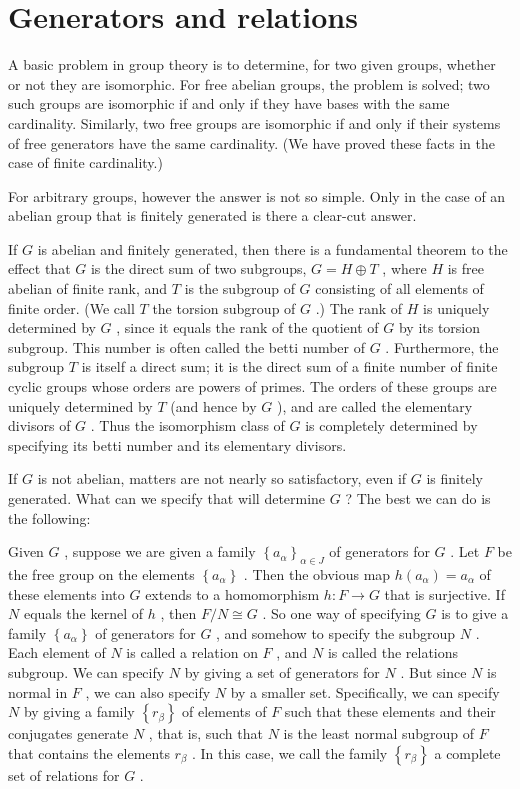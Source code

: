 \documentclass[10pt]{article}
\begin{document}
\section*{Generators and relations}

A basic problem in group theory is to determine, for two given groups, whether or not they are isomorphic. For free abelian groups, the problem is solved; two such groups are isomorphic if and only if they have bases with the same cardinality. Similarly, two free groups are isomorphic if and only if their systems of free generators have the same cardinality. (We have proved these facts in the case of finite cardinality.)

For arbitrary groups, however the answer is not so simple. Only in the case of an abelian group that is finitely generated is there a clear-cut answer.

If \(G\) is abelian and finitely generated, then there is a fundamental theorem to the effect that \(G\) is the direct sum of two subgroups, \(G = H \oplus  T\) , where \(H\) is free abelian of finite rank, and \(T\) is the subgroup of \(G\) consisting of all elements of finite order. (We call \(T\) the torsion subgroup of \(G\) .) The rank of \(H\) is uniquely determined by \(G\) , since it equals the rank of the quotient of \(G\) by its torsion subgroup. This number is often called the betti number of \(G\) . Furthermore, the subgroup \(T\) is itself a direct sum; it is the direct sum of a finite number of finite cyclic groups whose orders are powers of primes. The orders of these groups are uniquely determined by \(T\) (and hence by \(G\) ), and are called the elementary divisors of \(G\) . Thus the isomorphism class of \(G\) is completely determined by specifying its betti number and its elementary divisors.

If \(G\) is not abelian, matters are not nearly so satisfactory, even if \(G\) is finitely generated. What can we specify that will determine \(G\) ? The best we can do is the following:

Given \(G\) , suppose we are given a family \({\left\{  {a}_{\alpha }\right\}  }_{\alpha  \in  J}\) of generators for \(G\) . Let \(F\) be the free group on the elements \(\left\{  {a}_{\alpha }\right\}\) . Then the obvious map \(h\left( {a}_{\alpha }\right)  = {a}_{\alpha }\) of these elements into \(G\) extends to a homomorphism \(h : F \rightarrow  G\) that is surjective. If \(N\) equals the kernel of \(h\) , then \(F/N \cong  G\) . So one way of specifying \(G\) is to give a family \(\left\{  {a}_{\alpha }\right\}\) of generators for \(G\) , and somehow to specify the subgroup \(N\) . Each element of \(N\) is called a relation on \(F\) , and \(N\) is called the relations subgroup. We can specify \(N\) by giving a set of generators for \(N\) . But since \(N\) is normal in \(F\) , we can also specify \(N\) by a smaller set. Specifically, we can specify \(N\) by giving a family \(\left\{  {r}_{\beta }\right\}\) of elements of \(F\) such that these elements and their conjugates generate \(N\) , that is, such that \(N\) is the least normal subgroup of \(F\) that contains the elements \({r}_{\beta }\) . In this case, we call the family \(\left\{  {r}_{\beta }\right\}\) a complete set of relations for \(G\) .
\end{document}
